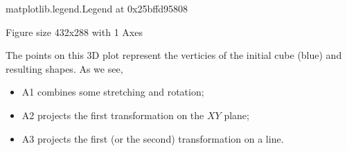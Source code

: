 \documentclass[letterpaper,10pt,english]{jupyterBook}
\begin{document}
\begin{sphinxVerbatim}[commandchars=\\\{\}]

   
\end{sphinxVerbatim}

\begin{sphinxVerbatim}[commandchars=\\\{\}]
\PYGZlt{}matplotlib.legend.Legend at 0x25bffd95808\PYGZgt{}
\end{sphinxVerbatim}

\begin{sphinxVerbatim}[commandchars=\\\{\}]
\PYGZlt{}Figure size 432x288 with 1 Axes\PYGZgt{}
\end{sphinxVerbatim}

\sphinxAtStartPar
The points on this 3D plot represent the verticies of the initial cube (blue) and resulting shapes.
As we see,
\begin{itemize}
\item {} 
\sphinxAtStartPar
A1 combines some stretching and rotation;

\item {} 
\sphinxAtStartPar
A2 projects the first transformation on the \(XY\) plane;

\item {} 
\sphinxAtStartPar
A3 projects the first (or the second) transformation on a line.

\end{itemize}
\end{document}
